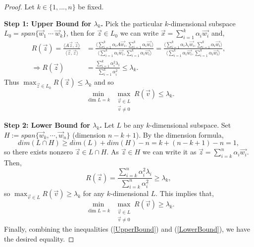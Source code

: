 \begin{proof}
Let $k \in \{ 1,..., n\}$ be fixed.

\textbf{Step 1: Upper Bound for $\lambda_k$.}
Pick the particular $k$-dimensional subspace $L_0=span\{\vec{w}_{1}\ \cdots\ \vec{w}_{k}\}$, then for $\vec{z} \in L_0$ we can write $\vec{x} = \sum_{i=1}^{k} \alpha_i \vec{w_i}$ and,
\begin{align*}
R(\vec{z}) = \frac{\langle A\vec{z}, \vec{z} \rangle}{\langle \vec{z}, \vec{z} \rangle} &= \frac{\langle \sum_{i=1}^k \alpha_i A\vec{w_i}, \sum_{i=1}^k \alpha_i\vec{w_i} \rangle}{\langle \sum_{i=1}^k \alpha_i\vec{w_i}, \sum_{i=1}^k \alpha_i\vec{w_i} \rangle} = \frac{\langle \sum_{i=1}^k \alpha_i \lambda_i\vec{w_i}, \sum_{i=1}^k \alpha_i\vec{w_i} \rangle}{\langle \sum_{i=1}^k \alpha_i\vec{w_i}, \sum_{i=1}^k \alpha_i\vec{w_i} \rangle}, \\
\Rightarrow R(\vec{z}) &= \frac{\sum_{i=1}^k\alpha_i^2 \lambda_i}{\sum_{i=1}^k \alpha_i^2} \leq \lambda_k.
\end{align*}
Thus $\max_{\vec{z}\in L_0} R(\vec{z}) \leq \lambda_k$ and so 
\begin{equation}\label{UpperBound}
\min_{\substack{\dim L = k}} \max_{\substack{\vec{v}\in L \\ \vec{v}\neq 0}} R(\vec{v}) \leq \lambda_k.
\end{equation}

\textbf{Step 2: Lower Bound for $\lambda_k$.}
Let $L$ be any $k$-dimensional subspace. Set $H:=span\{\vec{w}_k,\cdots,\vec{w}_n\}$ (dimension $n-k+1$).
By the dimension formula,
\[
dim(L\cap H) \geq dim(L) + dim(H) - n = k + (n-k+1) - n = 1,
\]
so there exists nonzero $\vec{z}\in L\cap H$. As $\vec{z}\in H$ we can write it as $\vec{z} = \sum_{i=k}^n \alpha_i \vec{w_i}$. Then, 
\[
R(\vec{z}) = \frac{\sum_{i=k}^n\alpha_i^2 \lambda_i}{\sum_{i=k}^n \alpha_i^2} \geq \lambda_k,
\]
so $\max_{\vec{v}\in L} R(\vec{v}) \geq  \lambda_k$ for any $k$-dimensional $L$. This implies that, 
\begin{equation}\label{LowerBound}
\min_{\substack{\dim L = k}} \max_{\substack{\vec{v}\in L \\ \vec{v}\neq 0}} R(\vec{v}) \geq \lambda_k.
\end{equation}
Finally, combining the inequalities (\ref{UpperBound}) and (\ref{LowerBound}), we have the desired equality.
\end{proof}

